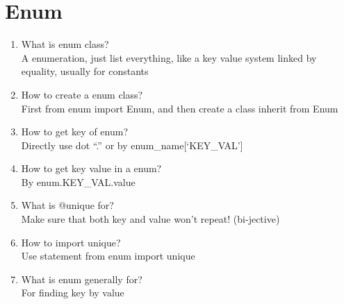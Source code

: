 \documentclass[10pt,a4paper,oneside]{article}
\begin{document}
\section{Enum}
\begin{enumerate}[1.]
\item What is enum class?\\
A enumeration, just list everything, like a key value system linked by equality, usually for constants
\item How to create a enum class?\\
First from enum import Enum, and then create a class inherit from Enum
\item How to get key of enum?\\
Directly use dot ``.'' or by enum\_name[`KEY\_VAL']
\item How to get key value in a enum?\\
By enum.KEY\_VAL.value
\item What is @unique for?\\
Make sure that both key and value won't repeat! (bi-jective)
\item How to import unique?\\
Use statement from enum import unique
\item What is enum generally for?\\
For finding key by value
\end{enumerate}
\end{document}
